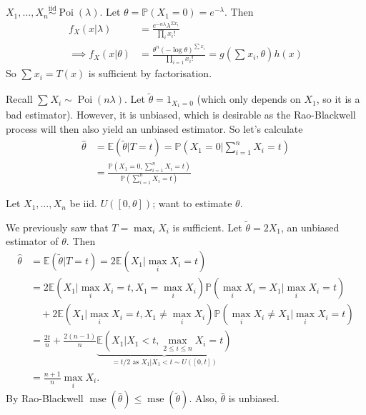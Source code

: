 \documentclass[egregdoesnotlikesansseriftitles,a4paper]{scrartcl}
\begin{document}
\begin{example*}
      $X_1 , \ldots ,X_n \overset{\operatorname{iid}}{\sim} \operatorname{Poi}(\lambda)$. Let $\theta=\mathbb{P}(X_1 =0)=e^{-\lambda}$. Then 
      \begin{align*}
           f_{X}(x|\lambda)&= \frac{e^{-n \lambda}\lambda^{\Sigma x_{i}}}{\prod_{i}^{}x_{i}!}\\
           \implies f_{X}(x|\theta)&= \frac{\theta^{n}(-\log \theta)^{\sum_{}^{}x_i}}{\prod_{i=1}^{}x_{i}!}=g (\sum_{}^{}x_i, \theta)h (x)
      \end{align*}
      So $\sum_{}^{}x_i=T (x)$ is sufficient by factorisation.

      Recall $\sum_{}^{}X_{i} \sim \operatorname{Poi}(n \lambda)$. Let $\widetilde{\theta}=1_{X_1 =0}$ (which only depends on $X_1$, so it is a bad estimator). However, it is unbiased, which is desirable as the Rao-Blackwell process will then also yield an unbiased estimator. So let's calculate 
      \begin{align*}
           \hat{\theta}&=\mathbb{E}(\widetilde{\theta}|T=t)=\mathbb{P}(X_1 =0|\sum_{i=1}^{n}X_{i}=t)\\
           &= \frac{\mathbb{P}(X_1 =0, \sum_{i=1}^{n}X_{i}=t)}{\mathbb{P}(\sum_{i=1}^{n}X_{i}=t)}
      \end{align*}
\end{example*}
\begin{example*}
      Let $X_1 , \ldots , X_n $ be iid. $U ([0, \theta])$; want to estimate $\theta$.

      We previously saw that $T=\max_{i}X_i$ is sufficient. Let $\widetilde{\theta} =2 X_1 $, an unbiased estimator of $\theta$. Then 
      \begin{align*}
          \hat{\theta}&=\mathbb{E} (\widetilde{\theta} | T=t)=2 \mathbb{E} (X_1 |\max_{i}X_i=t )\\
          &=2 \mathbb{E} (X_1 |\max_{i}X_i=t, X_1 =\max_{i}X_i) \mathbb{P}(\max_{i}X_i=X_1| \max_{i}X_i=t )\\& \quad +2\mathbb{E} (X_1 |\max_{i}X_i=t, X_1 \neq \max_{i}X_i) \mathbb{P}(\max_{i}X_i \neq X_1 | \max_{i}X_i=t )\\
          &=\frac{2t}{n}+ \frac{2 (n-1)}{n}\underbrace{\mathbb{E}(X_1 | X_1 <t, \max_{2 \leq i \leq n}X_i =t)}_{=t/2 \text{ as } X_1 | X_1 <t \sim U ([0,t])} \\
          &= \frac{n+1}{n }\max_i X_i.
      \end{align*}
      By Rao-Blackwell $\operatorname{mse}(\hat{\theta}) \leq \operatorname{mse}(\widetilde{\theta} )$. Also, $\hat{\theta} $ is unbiased.
\end{example*}
\end{document}
